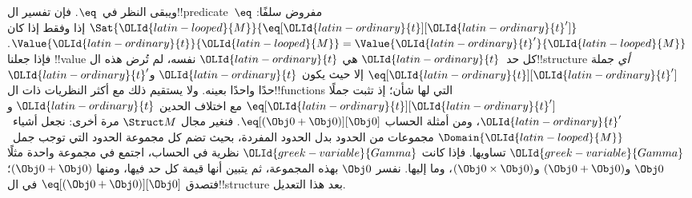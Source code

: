 \documentclass[../../../include/open-logic-section]{subfiles}
\begin{document}
{ويبقى النظر في~$\eq$. فإن تفسير ال!!{predicate}~$\eq$ مفروض
سلفًا: $\Sat{\OLId{latin-looped}{M}}{\eq[\OLId{latin-ordinary}{t}][\OLId{latin-ordinary}{t}']}$ إذا وفقط إذا كان
$\Value{\OLId{latin-ordinary}{t}}{\OLId{latin-looped}{M}} = \Value{\OLId{latin-ordinary}{t}'}{\OLId{latin-looped}{M}}$. فإذا جعلنا !!{value} كل حد~$\OLId{latin-ordinary}{t}$
هي $\OLId{latin-ordinary}{t}$ نفسه، لم تُرض هذه ال!!{structure} \emph{أي} جملة
$\eq[\OLId{latin-ordinary}{t}][\OLId{latin-ordinary}{t}']$ إلا حيث يكون $\OLId{latin-ordinary}{t}$ و$\OLId{latin-ordinary}{t}'$ حدًا واحدًا بعينه. ولا يستقيم
ذلك مع أكثر النظريات ذات ال!!{function}s التي لها شأن؛ إذ تثبت
جملًا $\eq[\OLId{latin-ordinary}{t}][\OLId{latin-ordinary}{t}']$ مع اختلاف الحدين $\OLId{latin-ordinary}{t}$ و$\OLId{latin-ordinary}{t}'$، ومن أمثلة الحساب
$\eq[(\Obj 0+ \Obj 0)][\Obj 0]$. فنغير مجال $\Struct M$ مرة أخرى:
نجعل أشياء~$\Domain{\OLId{latin-looped}{M}}$ مجموعات من الحدود بدل الحدود المفردة،
بحيث تضم كل مجموعة الحدود التي توجب جمل~$\OLId{greek-variable}{Gamma}$ تساويها.
فإذا كانت $\OLId{greek-variable}{Gamma}$ نظرية في الحساب، اجتمع في مجموعة واحدة مثلًا
$\Obj 0$ و$(\Obj 0 + \Obj 0)$ و$(\Obj
0 \times \Obj 0)$، وما إليها. نفسر $\Obj 0$ بهذه المجموعة، ثم
يتبين أنها قيمة كل حد فيها، ومنها $(\Obj 0 + \Obj 0)$؛ فتصدق
$\eq[(\Obj 0+ \Obj 0)][\Obj 0]$ في ال!!{structure} بعد هذا
التعديل.}{}
\end{document}
